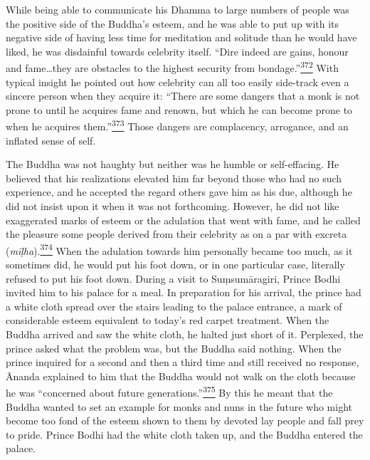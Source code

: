 While being able to communicate his Dhamma to large numbers of people
was the positive side of the Buddha's esteem, and he was able to put up
with its negative side of having less time for meditation and solitude
than he would have liked, he was disdainful towards celebrity itself.
``Dire indeed are gains, honour and fame\ldots they are obstacles to the
highest security from
bondage.''\label{footprints_split_011.html_fnref372}\hyperref[footprints_split_024.htmlux5cux23fn372]{\textsuperscript{372}}
With typical insight he pointed out how celebrity can all too easily
side-track even a sincere person when they acquire it: ``There are some
dangers that a monk is not prone to until he acquires fame and renown,
but which he can become prone to when he acquires
them.''\label{footprints_split_011.html_fnref373}\hyperref[footprints_split_024.htmlux5cux23fn373]{\textsuperscript{373}}
Those dangers are complacency, arrogance, and an inflated sense of self.

The Buddha was not haughty but neither was he humble or self-effacing.
He believed that his realizations elevated him far beyond those who had
no such experience, and he accepted the regard others gave him as his
due, although he did not insist upon it when it was not forthcoming.
However, he did not like exaggerated marks of esteem or the adulation
that went with fame, and he called the pleasure some people derived from
their celebrity as on a par with excreta
(\emph{mīḷha}).\label{footprints_split_011.html_fnref374}\hyperref[footprints_split_024.htmlux5cux23fn374]{\textsuperscript{374}}
When the adulation towards him personally became too much, as it
sometimes did, he would put his foot down, or in one particular case,
literally refused to put his foot down. During a visit to Suṃsumāragiri,
Prince Bodhi invited him to his palace for a meal. In preparation for
his arrival, the prince had a white cloth spread over the stairs leading
to the palace entrance, a mark of considerable esteem equivalent to
today's red carpet treatment. When the Buddha arrived and saw the white
cloth, he halted just short of it. Perplexed, the prince asked what the
problem was, but the Buddha said nothing. When the prince inquired for a
second and then a third time and still received no response, Ānanda
explained to him that the Buddha would not walk on the cloth because he
was ``concerned about future
generations.''\label{footprints_split_011.html_fnref375}\hyperref[footprints_split_024.htmlux5cux23fn375]{\textsuperscript{375}}
By this he meant that the Buddha wanted to set an example for monks and
nuns in the future who might become too fond of the esteem shown to them
by devoted lay people and fall prey to pride. Prince Bodhi had the white
cloth taken up, and the Buddha entered the palace.

